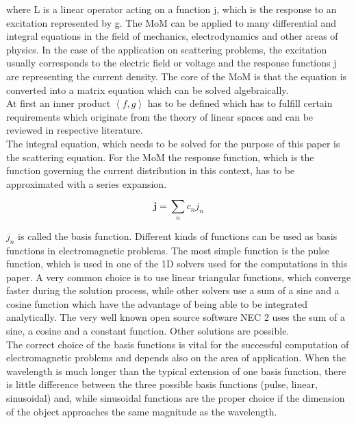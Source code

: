 \documentclass[a4paper,11pt]{article}
\begin{document}
where L is a linear operator acting on a function j, which is the response to an excitation represented by g. The MoM can be applied to many differential and integral equations in the field of mechanics, electrodynamics and other areas of physics. In the case of the application on scattering problems, the excitation usually corresponds to the electric field or voltage and the response functions j are representing the current density. The core of the MoM is that the equation is converted into a matrix equation which can be solved algebraically.\\

At first an inner product $\left\langle f,g\right\rangle$ has to be defined which has to fulfill certain requirements which originate from the theory of linear spaces and can be reviewed in respective literature.\\

The integral equation, which needs to be solved for the purpose of this paper is the scattering equation. For the MoM the response function, which is the function governing the current distribution in this context, has to be approximated with a series expansion.

\begin{equation}\label{eq:bas_funct_expans}
 \mathbf{j}=\sum_{n} c_n j_n
\end{equation}

$j_n$ is called the basis function. Different kinds of functions can be used as basis functions in electromagnetic problems. The most simple function is the pulse function, which is used in one of the 1D solvers used for the computations in this paper. A very common choice is to use linear triangular functions, which converge faster during the solution process, while other solvers use a sum of a sine and a cosine function which have the advantage of being able to be integrated analytically. The very well known open source software NEC 2 uses the sum of a sine, a cosine and a constant function. Other solutions are possible.\\

The correct choice of the basis functions is vital for the successful computation of electromagnetic problems and depends also on the area of application. When the wavelength is much longer than the typical extension of one basis function, there is little difference between the three possible basis functions (pulse, linear, sinusoidal) and, while sinusoidal functions are the proper choice if the dimension of the object approaches the same magnitude as the wavelength.\\
\end{document}
